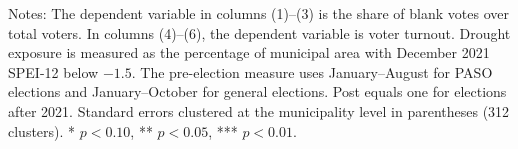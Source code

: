 \begin{table}[!htbp]
\vspace{0.2cm}
\begin{minipage}{0.98\textwidth}
\footnotesize Notes: The dependent variable in columns (1)--(3) is the share of blank votes over total voters. In columns (4)--(6), the dependent variable is voter turnout. Drought exposure is measured as the percentage of municipal area with December 2021 SPEI-12 below $-1.5$. The pre-election measure uses January--August for PASO elections and January--October for general elections. Post equals one for elections after 2021. Standard errors clustered at the municipality level in parentheses (312 clusters). * $p<0.10$, ** $p<0.05$, *** $p<0.01$.
\end{minipage}
\end{table}
